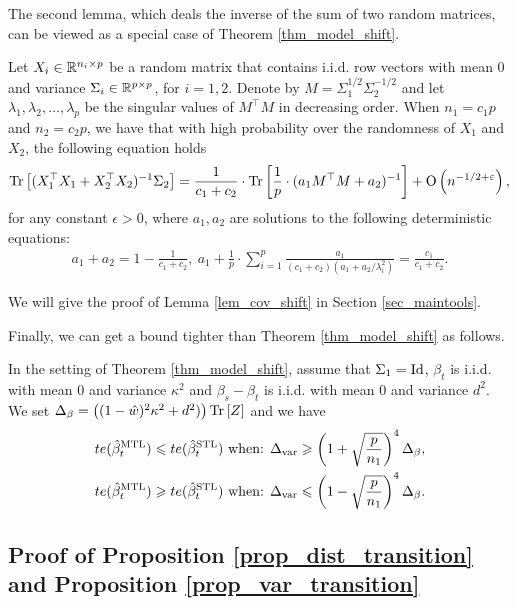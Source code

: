 The second lemma, which deals the inverse of the sum of two random matrices, can be viewed as a special case of Theorem \ref{thm_model_shift}.
\begin{lemma}\label{lem_cov_shift}
	Let $X_i\in\mathbb{R}^{n_i\times p}$ be a random matrix that contains i.i.d. row vectors with mean $0$ and variance $\Sigma_i\in\mathbb{R}^{p\times p}$, for $i = 1, 2$.
	Denote by $M = \Sigma_1^{1/2}\Sigma_2^{-1/2}$ and let $\lambda_1, \lambda_2, \dots, \lambda_p$ be the singular values of $M^{\top}M$ in decreasing order.
	When $n_1 = c_1 p$ and $n_2 = c_2 p$, we have that with high probability over the randomness of $X_1$ and $X_2$, the following equation holds
	\begin{align}%
		\bigtr{(X_1^{\top}X_1 + X_2^{\top}X_2)^{-1}\Sigma_2} = \frac{1}{c_1+c_2}\cdot \bigtr{ \frac{1}{p}\cdot(a_1 M^\top M + a_2)^{-1}} +\bigo{ n^{-1/2+\epsilon}},
	\end{align}
	for any constant $\epsilon>0$, where $a_1, a_2$ are solutions to the following deterministic equations:
	\begin{align}
		a_1 + a_2 = 1- \frac{1}{c_1 + c_2},~ a_1 + \frac{1}{p}\cdot\sum_{i=1}^p \frac{a_1}{(c_1 + c_2)(a_1 + a_2/ \lambda_i^2)} = \frac{c_1}{c_1 + c_2}. \label{eq_a12}
	\end{align}
\end{lemma}
We will give the proof of Lemma \ref{lem_cov_shift} in Section \ref{sec_maintools}.

Finally, we can get a bound tighter than Theorem \ref{thm_model_shift} as follows.
\begin{lemma}\label{prop_model_shift_tight}
		In the setting of Theorem \ref{thm_model_shift}, assume that $\Sigma_1 =\operatorname{Id}$,
		$\beta_t$ is i.i.d. with mean $0$ and variance $\kappa^2$ and $\beta_s - \beta_t$ is i.i.d. with mean $0$ and variance $d^2$.
		We set $\Delta_{\beta} = \left({(1 - \hat{w})^2 \kappa^2 + d^2)}\right) \operatorname{Tr}\left[Z\right]$
		and we have
		\begin{align*}
			te(\hat{\beta}_t^{\text{MTL}}) \leqslant te(\hat{\beta}_t^{\text{STL}}) \text{ when: } & \Delta_{\text{var}} \geqslant \left({1 + \sqrt{\frac{p}{n_1}}}\right)^4 \Delta_{\beta}, \\
			te(\hat{\beta}_t^{\text{MTL}}) \geqslant te(\hat{\beta}_t^{\text{STL}}) \text{ when: } & \Delta_{\text{var}} \leqslant \left({1 - \sqrt{\frac{p}{n_1}}}\right)^4 \Delta_{\beta}.
		\end{align*}
\end{lemma}

\subsection{Proof of Proposition \ref{prop_dist_transition} and Proposition \ref{prop_var_transition}}\label{app_proof_31}

